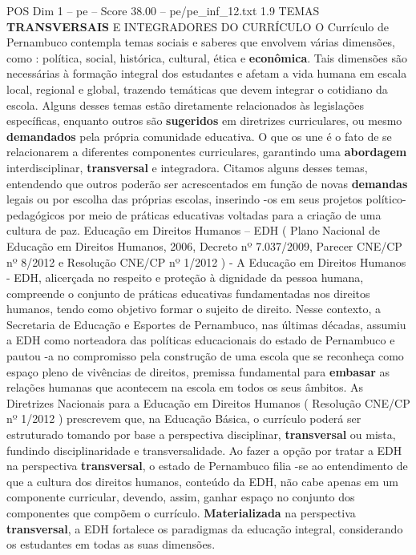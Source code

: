 \begin{textsample}{POS Dim 1 – pe – Score 38.00 – pe/pe\_inf\_12.txt}  \label{ex:f1_pos_245}
1.9 TEMAS \textbf{TRANSVERSAIS} E INTEGRADORES DO CURRÍCULO O Currículo de Pernambuco contempla temas sociais e saberes que envolvem várias dimensões, como : política, social, histórica, cultural, ética e \textbf{econômica}.
Tais dimensões são necessárias à formação integral dos estudantes e afetam a vida humana em escala local, regional e global, trazendo temáticas que devem integrar o cotidiano da escola.
Alguns desses temas estão diretamente relacionados às legislações específicas, enquanto outros são \textbf{sugeridos} em diretrizes curriculares, ou mesmo \textbf{demandados} pela própria comunidade educativa.
O que os une é o fato de se relacionarem a diferentes componentes curriculares, garantindo uma \textbf{abordagem} interdisciplinar, \textbf{transversal} e integradora.
Citamos alguns desses temas, entendendo que outros poderão ser acrescentados em função de novas \textbf{demandas} legais ou por escolha das próprias escolas, inserindo -os em seus projetos político-pedagógicos por meio de práticas educativas voltadas para a criação de uma cultura de paz.
Educação em Direitos Humanos – EDH ( Plano Nacional de Educação em Direitos Humanos, 2006, Decreto nº 7.037/2009, Parecer CNE/CP nº 8/2012 e Resolução CNE/CP nº 1/2012 ) - A Educação em Direitos Humanos - EDH, alicerçada no respeito e proteção à dignidade da pessoa humana, compreende o conjunto de práticas educativas fundamentadas nos direitos humanos, tendo como objetivo formar o sujeito de direito.
Nesse contexto, a Secretaria de Educação e Esportes de Pernambuco, nas últimas décadas, assumiu a EDH como norteadora das políticas educacionais do estado de Pernambuco e pautou -a no compromisso pela construção de uma escola que se reconheça como espaço pleno de vivências de direitos, premissa fundamental para \textbf{embasar} as relações humanas que acontecem na escola em todos os seus âmbitos.
As Diretrizes Nacionais para a Educação em Direitos Humanos ( Resolução CNE/CP nº 1/2012 ) prescrevem que, na Educação Básica, o currículo poderá ser estruturado tomando por base a perspectiva disciplinar, \textbf{transversal} ou mista, fundindo disciplinaridade e transversalidade.
Ao fazer a opção por tratar a EDH na perspectiva \textbf{transversal}, o estado de Pernambuco filia -se ao entendimento de que a cultura dos direitos humanos, conteúdo da EDH, não cabe apenas em um componente curricular, devendo, assim, ganhar espaço no conjunto dos componentes que compõem o currículo. \textbf{Materializada} na perspectiva \textbf{transversal}, a EDH fortalece os paradigmas da educação integral, considerando os estudantes em todas as suas dimensões.

\end{textsample}
